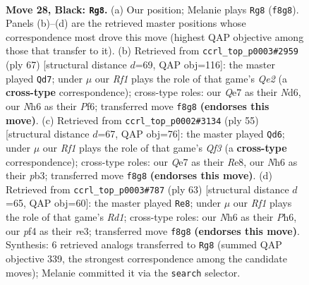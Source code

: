 \documentclass[11pt]{article}
\begin{document}
\clearpage

\begin{figure}[p]\centering
\begin{subfigure}{0.46\textwidth}\centering
\resizebox{\linewidth}{!}{%
\newchessgame
\chessboard[
  setfen={4kr2/p1p1q1pp/1p2p2n/2p1Q3/5P2/2P3P1/1P5P/2K3R1 b - - 4 28},
  showmover=false,
  pgfstyle=straightmove, color=movearrow, markmove={f8-g8}
]}
\caption{}
\end{subfigure}\hfill
\begin{subfigure}{0.46\textwidth}\centering
\resizebox{\linewidth}{!}{%
\newchessgame
\chessboard[
  setfen={4k3/1p2q1p1/pQpn1p1p/P6P/1P6/4P1P1/5PB1/6K1 b - - 4 34},
  showmover=false,
  pgfstyle=straightmove, color=movearrow, markmove={e7-d7}
]}
\caption{}
\end{subfigure}
\\[4pt]
\begin{subfigure}{0.46\textwidth}\centering
\resizebox{\linewidth}{!}{%
\newchessgame
\chessboard[
  setfen={4r3/2p2pk1/1p3qp1/p2Pp3/2P1Q3/1P4P1/P4PK1/3R4 b - - 0 28},
  showmover=false,
  pgfstyle=straightmove, color=movearrow, markmove={f6-d6}
]}
\caption{}
\end{subfigure}\hfill
\begin{subfigure}{0.46\textwidth}\centering
\resizebox{\linewidth}{!}{%
\newchessgame
\chessboard[
  setfen={1k1r4/1ppq4/p2p2pp/P7/5P2/3QR1P1/1PP4P/1K6 b - - 3 32},
  showmover=false,
  pgfstyle=straightmove, color=movearrow, markmove={d8-e8}
]}
\caption{}
\end{subfigure}
\caption{\textbf{Move 28, Black: \texttt{Rg8}.} (a) Our position; Melanie plays \texttt{Rg8} (\texttt{f8g8}). Panels (b)--(d) are the retrieved master positions whose correspondence most drove this move (highest QAP objective among those that transfer to it). (b) Retrieved from \texttt{ccrl\_top\_p0003\#2959} (ply 67) [structural distance $d$=69, QAP obj=116]: the master played \texttt{Qd7}; under $\mu$ our \emph{Rf1} plays the role of that game's \emph{Qe2} (a \textbf{cross-type} correspondence); cross-type roles: our \emph{Q}e7 as their \emph{N}d6, our \emph{N}h6 as their \emph{P}f6; transferred move \texttt{f8g8} \textbf{(endorses this move)}. (c) Retrieved from \texttt{ccrl\_top\_p0002\#3134} (ply 55) [structural distance $d$=67, QAP obj=76]: the master played \texttt{Qd6}; under $\mu$ our \emph{Rf1} plays the role of that game's \emph{Qf3} (a \textbf{cross-type} correspondence); cross-type roles: our \emph{Q}e7 as their \emph{R}e8, our \emph{N}h6 as their \emph{p}b3; transferred move \texttt{f8g8} \textbf{(endorses this move)}. (d) Retrieved from \texttt{ccrl\_top\_p0003\#787} (ply 63) [structural distance $d$=65, QAP obj=60]: the master played \texttt{Re8}; under $\mu$ our \emph{Rf1} plays the role of that game's \emph{Rd1}; cross-type roles: our \emph{N}h6 as their \emph{P}h6, our \emph{p}f4 as their \emph{r}e3; transferred move \texttt{f8g8} \textbf{(endorses this move)}. Synthesis: 6 retrieved analogs transferred to \texttt{Rg8} (summed QAP objective 339, the strongest correspondence among the candidate moves); Melanie committed it via the \texttt{search} selector.}
\label{fig:thought-m55}
\end{figure}
\end{document}
